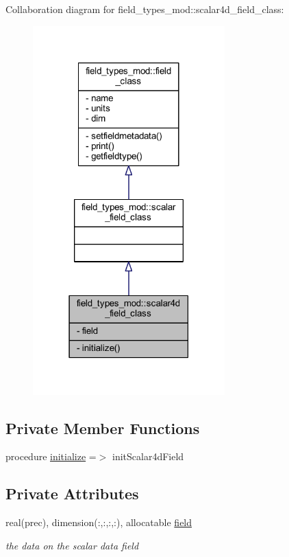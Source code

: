 Collaboration diagram for field\+\_\+types\+\_\+mod\+:\+:scalar4d\+\_\+field\+\_\+class\+:
\nopagebreak
\begin{figure}[H]
\begin{center}
\leavevmode
\includegraphics[width=210pt]{structfield__types__mod_1_1scalar4d__field__class__coll__graph}
\end{center}
\end{figure}
\subsection*{Private Member Functions}
\begin{DoxyCompactItemize}
\item 
procedure \mbox{\hyperlink{structfield__types__mod_1_1scalar4d__field__class_ae2fc1ab22b67e883028f0b00395b3e82}{initialize}} =$>$ init\+Scalar4d\+Field
\end{DoxyCompactItemize}
\subsection*{Private Attributes}
\begin{DoxyCompactItemize}
\item 
real(prec), dimension(\+:,\+:,\+:,\+:), allocatable \mbox{\hyperlink{structfield__types__mod_1_1scalar4d__field__class_abb02055e1e69f0d70d67378b8c31ce85}{field}}
\begin{DoxyCompactList}\small\item\em the data on the scalar data field \end{DoxyCompactList}\end{DoxyCompactItemize}


